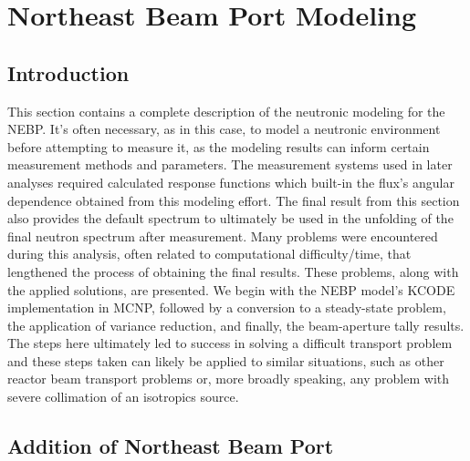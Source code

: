 
\cleardoublepage


\chapter{Northeast Beam Port Modeling}


\section{Introduction}

This section contains a complete description of the neutronic modeling for the NEBP.
It's often necessary, as in this case, to model a neutronic environment before attempting to measure it, as the modeling results can inform certain measurement methods and parameters.
The measurement systems used in later analyses required calculated response functions which built-in the flux's angular dependence obtained from this modeling effort.
The final result from this section also provides the default spectrum to ultimately be used in the unfolding of the final neutron spectrum after measurement.
Many problems were encountered during this analysis, often related to computational difficulty/time, that lengthened the process of obtaining the final results.
These problems, along with the applied solutions, are presented.
We begin with the NEBP model's KCODE implementation in MCNP, followed by a conversion to a steady-state problem, the application of variance reduction, and finally, the beam-aperture tally results.
The steps here ultimately led to success in solving a difficult transport problem and these steps taken can likely be applied to similar situations, such as other reactor beam transport problems or, more broadly speaking, any problem with severe collimation of an isotropics source.

\section{Addition of Northeast Beam Port}


